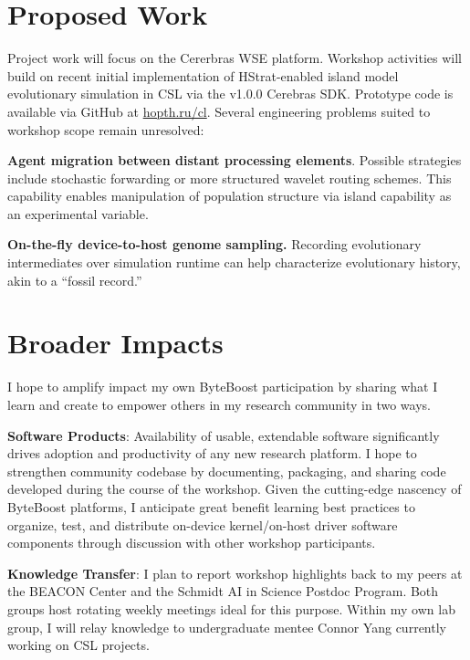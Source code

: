 \section{Proposed Work}

Project work will focus on the Cererbras WSE platform.
Workshop activities will build on recent initial implementation of HStrat-enabled island model evolutionary simulation in CSL via the v1.0.0 Cerebras SDK.
Prototype code is available via GitHub at \url{hopth.ru/cl}.
Several engineering problems suited to workshop scope remain unresolved:
\begin{enumerate*}
\item \textbf{Agent migration between distant processing elements}.
Possible strategies include stochastic forwarding or more structured wavelet routing schemes.
This capability enables manipulation of population structure via island capability as an experimental variable.

\item \textbf{On-the-fly device-to-host genome sampling.}
Recording evolutionary intermediates over simulation runtime can help characterize evolutionary history, akin to a ``fossil record.''
\end{enumerate*}

\section{Broader Impacts}

I hope to amplify impact my own ByteBoost participation by sharing what I learn and create to empower others in my research community in two ways.
\begin{enumerate*}
\item \textbf{Software Products}: Availability of usable, extendable software significantly drives adoption and productivity of any new research platform.
I hope to strengthen community codebase by documenting, packaging, and sharing code developed during the course of the workshop.
Given the cutting-edge nascency of ByteBoost platforms, I anticipate great benefit learning best practices to organize, test, and distribute on-device kernel/on-host driver software components through discussion with other workshop participants.
\item \textbf{Knowledge Transfer}: I plan to report workshop highlights back to my peers at the BEACON Center and the Schmidt AI in Science Postdoc Program.
Both groups host rotating weekly meetings ideal for this purpose.
Within my own lab group, I will relay knowledge to undergraduate mentee Connor Yang currently working on CSL projects.
\end{enumerate*}


